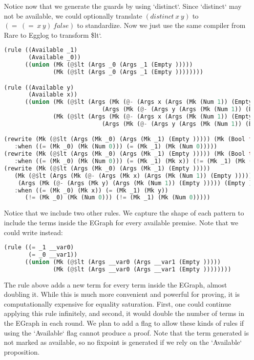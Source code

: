 \documentclass{article}
\begin{document}
Notice now that we generate the guards by using `distinct`. Since `distinct` may not be available, we could optionally translate $(distinct\:x\:y)$ to $(=\:(=\:x\:y)\:false)$ to standardize. Now we just use the same compiler from Rare to Egglog to transform \$lt`.

\begin{lstlisting}[language=Rust]
(rule ((Available _1)
       (Available _0))
      ((union (Mk (@$lt (Args _0 (Args _1 (Empty )))))
              (Mk (@$lt (Args _0 (Args _1 (Empty ))))))))

(rule ((Available y)
       (Available x))
      ((union (Mk (@$lt (Args (Mk (@- (Args x (Args (Mk (Num 1)) (Empty ))))) 
                            (Args (Mk (@- (Args y (Args (Mk (Num 1)) (Empty ))))) (Empty )))))
              (Mk (@$lt (Args (Mk (@- (Args x (Args (Mk (Num 1)) (Empty )))))
                            (Args (Mk (@- (Args y (Args (Mk (Num 1)) (Empty ))))) (Empty ))))))))

(rewrite (Mk (@$lt (Args (Mk _0) (Args (Mk _1) (Empty ))))) (Mk (Bool false)) 
   :when ((= (Mk _0) (Mk (Num 0))) (= (Mk _1) (Mk (Num 0)))))
(rewrite (Mk (@$lt (Args (Mk _0) (Args (Mk _1) (Empty ))))) (Mk (Bool true)) 
   :when ((= (Mk _0) (Mk (Num 0))) (= (Mk _1) (Mk x)) (!= (Mk _1) (Mk (Num 0)))))
(rewrite (Mk (@$lt (Args (Mk _0) (Args (Mk _1) (Empty ))))) 
   (Mk (@$lt (Args (Mk (@- (Args (Mk x) (Args (Mk (Num 1)) (Empty ))))) 
    (Args (Mk (@- (Args (Mk y) (Args (Mk (Num 1)) (Empty ))))) (Empty ))))) 
   :when ((= (Mk _0) (Mk x)) (= (Mk _1) (Mk y)) 
      (!= (Mk _0) (Mk (Num 0))) (!= (Mk _1) (Mk (Num 0)))))
\end{lstlisting}

Notice that we include two other rules. We capture the shape of each pattern to include the terms inside the EGraph for every available premise. Note that we could write instead:

\begin{lstlisting}[language=Rust]
(rule ((= _1 __var0)
       (= _0 __var1))
      ((union (Mk (@$lt (Args __var0 (Args __var1 (Empty )))))
              (Mk (@$lt (Args __var0 (Args __var1 (Empty ))))))))
\end{lstlisting}

The rule above adds a new term for every term inside the EGraph, almost doubling it. While this is much more convenient and powerful for proving, it is computationally expensive for equality saturation. First, one could continue applying this rule infinitely, and second, it would double the number of terms in the EGraph in each round. We plan to add a flag to allow these kinds of rules if using the `Available` flag cannot produce a proof.
Note that the term generated is not marked as available, so no fixpoint is generated if we rely on the `Available` proposition. 
\end{document}
